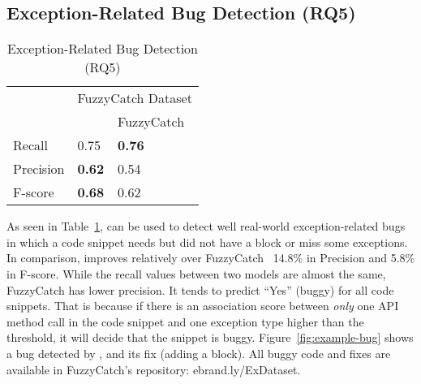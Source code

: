 \subsection{Exception-Related Bug Detection (RQ5)}
\label{sec:rq1}

\begin{table}[t]%
  \caption {Exception-Related Bug Detection (RQ5)}
  \vspace{-12pt}
  \small
	\begin{center}
		\renewcommand{\arraystretch}{1}
		\begin{tabular}{|p{1.75cm}<{\centering}|p{1.75cm}<{\centering}|p{1.75cm}<{\centering}|}
		  \hline
			\multirow{2}{*}{} & \multicolumn{2}{c|}{FuzzyCatch Dataset} \\
			\cline{2-3}
			  & \tool  & FuzzyCatch~\cite{xrank-fse20} \\
			\hline
			Recall    & 0.75 & \textbf{0.76}\\
			Precision & \textbf{0.62} & 0.54\\
			F-score   & \textbf{0.68} & 0.62\\
			\hline
		\end{tabular}
		\label{tab:bug}
	\end{center}
\end{table}



As seen in Table~\ref{tab:bug}, {\tool} can be used to detect well
real-world exception-related bugs in which a code snippet needs but
did not have a  block or miss some exceptions. In
comparison, {\tool} improves relatively over
FuzzyCatch~\cite{xrank-fse20} 14.8\% in Precision and
5.8\% in F-score.
While the recall values between two models are almost the same,
FuzzyCatch has lower precision. It tends to predict ``Yes'' (buggy)
for all code snippets. That is because if there is an association
score between {\em only} one API method call in the code snippet and
one exception type higher than the threshold, it will decide that the
snippet is buggy. Figure~\ref{fig:example-bug} shows a bug detected by
{\tool}, and its fix (adding a  block). All buggy code
and fixes are available in FuzzyCatch's repository:
ebrand.ly/ExDataset.




